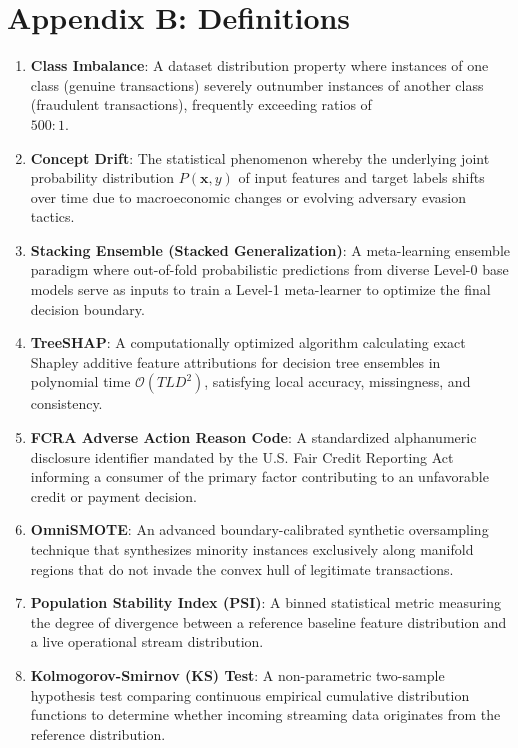 \documentclass[12pt,a4paper,oneside]{report}
\begin{document}
\newpage


\chapter*{Appendix B: Definitions}

\begin{enumerate}[leftmargin=0.35in]
\item \textbf{Class Imbalance}: A dataset distribution property where instances of one class (genuine transactions) severely outnumber instances of another class (fraudulent transactions), frequently exceeding ratios of \\$500:1$.
\item \textbf{Concept Drift}: The statistical phenomenon whereby the underlying joint probability distribution $P(\mathbf{x}, y)$ of input features and target labels shifts over time due to macroeconomic changes or evolving adversary evasion tactics.
\item \textbf{Stacking Ensemble (Stacked Generalization)}: A meta-learning ensemble paradigm where out-of-fold probabilistic predictions from diverse Level-0 base models serve as inputs to train a Level-1 meta-learner to optimize the final decision boundary.
\item \textbf{TreeSHAP}: A computationally optimized algorithm calculating exact Shapley additive feature attributions for decision tree ensembles in polynomial time $\mathcal{O}(T L D^2)$, satisfying local accuracy, missingness, and consistency.
\item \textbf{FCRA Adverse Action Reason Code}: A standardized alphanumeric disclosure identifier mandated by the U.S. Fair Credit Reporting Act informing a consumer of the primary factor contributing to an unfavorable credit or payment decision.
\item \textbf{OmniSMOTE}: An advanced boundary-calibrated synthetic oversampling technique that synthesizes minority instances exclusively along manifold regions that do not invade the convex hull of legitimate transactions.
\item \textbf{Population Stability Index (PSI)}: A binned statistical metric measuring the degree of divergence between a reference baseline feature distribution and a live operational stream distribution.
\item \textbf{Kolmogorov-Smirnov (KS) Test}: A non-parametric two-sample hypothesis test comparing continuous empirical cumulative distribution functions to determine whether incoming streaming data originates from the reference distribution.

\end{enumerate}
\end{document}
